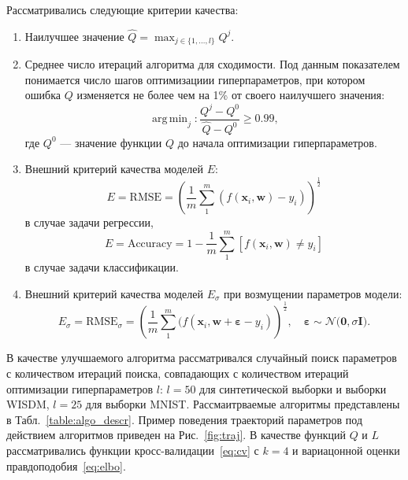 \documentclass[12pt]{article}
\DeclareMathOperator*{\argmin}{arg\,min}
\begin{document}
Рассматривались следующие критерии качества:
\begin{enumerate}
\item Наилучшее значение $\hat{Q} = \max_{j \in \{1, \dots, l\}}Q^j$.
\item Среднее число итераций алгоритма для сходимости. Под данным показателем понимается число шагов оптимизациии гиперпараметров, при котором ошибка $Q$ изменяется не более чем на 1\% от своего наилучшего значения:
\[
    \argmin_{j}: \frac{Q^j - Q^0}{\hat{Q} - Q^0} \geq 0.99,
\]
где $Q^0$ --- значение функции $Q$ до начала оптимизации гиперпараметров.

\item Внешний критерий качества моделей $E$:
\[
    E = \text{RMSE} = \left (\frac{1}{m}\sum_{1}^m (f(\mathbf{x}_i, \mathbf{w})-y_i)\right)^{\frac{1}{2}}
\]
в случае задачи регрессии,
\[
    E = \text{Accuracy} = 1 - \frac{1}{m}\sum_1^m [f(\mathbf{x}_i, \mathbf{w}) \neq y_i]
\]
в случае задачи классификации.

\item Внешний критерий качества моделей $E_\sigma$ при возмущении параметров модели:
\[
    E_\sigma = \text{RMSE}_\sigma = \left (\frac{1}{m}\sum_{1}^m (f(\mathbf{x}_i, \mathbf{w} + \boldsymbol{\varepsilon}-y_i)\right)^{\frac{1}{2}}, \quad \boldsymbol{\varepsilon} \sim \mathcal{N}\bigl(\mathbf{0}, \sigma\mathbf{I}\bigr).
\]
\end{enumerate}

В качестве улучшаемого алгоритма рассматривался случайный поиск параметров с количеством итераций поиска, совпадающих с количеством итераций оптимизации гиперпараметров $l$: $l=50$ для синтетической выборки и выборки WISDM, $l=25$ для выборки MNIST. Рассмаитрваемые алгоритмы представлены в Табл.~\ref{table:algo_descr}. Пример поведения траекторий параметров под действием алгоритмов приведен на Рис.~\ref{fig:traj}. В качестве функций $Q$ и $L$ рассматривались функции кросс-валидации~\eqref{eq:cv} с $k=4$ и вариацонной оценки правдоподобия~\eqref{eq:elbo}. 
\end{document}

